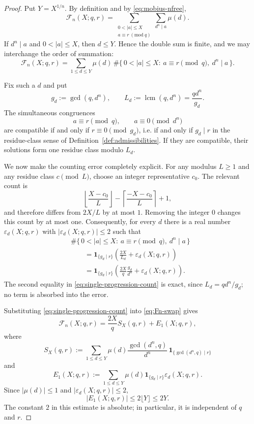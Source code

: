 \documentclass[10pt,a4paper]{amsart}
\begin{document}
\begin{proof}
Put $Y=X^{1/n}$. By definition and by \eqref{eq:mobius-nfree},
\[
\mathcal F_n(X;q,r)
=\sum_{\substack{0<|a|\le X\\ a\equiv r\ (\mathrm{mod}\ q)}}
 \sum_{d^n\mid a}\mu(d).
\]
If $d^n\mid a$ and $0<|a|\le X$, then $d\le Y$. Hence the double sum is finite, and we may
interchange the order of summation:
\begin{equation}\label{eq:Fn-swap}
\mathcal F_n(X;q,r)
=\sum_{1\le d\le Y}\mu(d)\,
\#\bigl\{\,0<|a|\le X:\ a\equiv r\pmod q,\ d^n\mid a\,\bigr\}.
\end{equation}

Fix such a $d$ and put
\[
g_d:=\gcd(q,d^n),\qquad
L_d:=\operatorname{lcm}(q,d^n)=\frac{qd^n}{g_d}.
\]
The simultaneous congruences
\[
a\equiv r\pmod q,
\qquad a\equiv0\pmod{d^n}
\]
are compatible if and only if $r\equiv0\pmod{g_d}$, i.e. if and only if $g_d\mid r$ in the
residue-class sense of Definition~\ref{def:admissibilities}. If they are compatible, their
solutions form one residue class modulo $L_d$.

We now make the counting error completely explicit. For any modulus $L\ge1$ and any residue
class $c\pmod L$, choose an integer representative $c_0$. The relevant count is
\[
\left\lfloor\frac{X-c_0}{L}\right\rfloor
-\left\lceil\frac{-X-c_0}{L}\right\rceil+1,
\]
and therefore differs from $2X/L$ by at most $1$. Removing the integer $0$ changes this count
by at most one. Consequently, for every $d$ there is a real number $\varepsilon_d(X;q,r)$ with
$|\varepsilon_d(X;q,r)|\le2$ such that
\begin{equation}\label{eq:single-progression-count}
\begin{aligned}
&\#\bigl\{\,0<|a|\le X:\ a\equiv r\pmod q,\ d^n\mid a\,\bigr\}\\
&\qquad=
\mathbf 1_{\{g_d\mid r\}}
\left(\frac{2X}{L_d}+\varepsilon_d(X;q,r)\right)\\
&\qquad=
\mathbf 1_{\{g_d\mid r\}}
\left(\frac{2X}{q}\frac{g_d}{d^n}+\varepsilon_d(X;q,r)\right).
\end{aligned}
\end{equation}
The second equality in \eqref{eq:single-progression-count} is exact, since
$L_d=qd^n/g_d$; no term is absorbed into the error.

Substituting \eqref{eq:single-progression-count} into \eqref{eq:Fn-swap} gives
\begin{equation}\label{eq:Fn-SX}
\mathcal F_n(X;q,r)=\frac{2X}{q}S_X(q,r)+E_1(X;q,r),
\end{equation}
where
\[
S_X(q,r):=
\sum_{1\le d\le Y}
\mu(d)\frac{\gcd(d^n,q)}{d^n}\,
\mathbf 1_{\{\gcd(d^n,q)\mid r\}}
\]
and
\[
E_1(X;q,r):=
\sum_{1\le d\le Y}
\mu(d)\mathbf 1_{\{g_d\mid r\}}\varepsilon_d(X;q,r).
\]
Since $|\mu(d)|\le1$ and $|\varepsilon_d(X;q,r)|\le2$,
\begin{equation}\label{eq:E1-bound}
|E_1(X;q,r)|\le2\lfloor Y\rfloor\le2Y.
\end{equation}
The constant $2$ in this estimate is absolute; in particular, it is independent of $q$ and $r$.


\end{proof}
\end{document}
